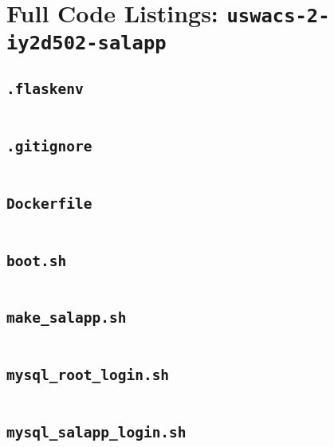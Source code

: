 \section{Full Code Listings: \texttt{uswacs-2-iy2d502-salapp}}
\subsection{\texttt{.flaskenv}}
\begin{codelisting}
\inputminted[breakanywhere]{text}{../uswacs-2-iy2d502-salapp/.flaskenv}\end{codelisting}
\subsection{\texttt{.gitignore}}
\begin{codelisting}
\inputminted[breakanywhere]{text}{../uswacs-2-iy2d502-salapp/.gitignore}\end{codelisting}
\subsection{\texttt{Dockerfile}}
\begin{codelisting}
\inputminted[breakanywhere]{text}{../uswacs-2-iy2d502-salapp/Dockerfile}\end{codelisting}
\subsection{\texttt{boot.sh}}
\begin{codelisting}
\inputminted[breakanywhere]{bash}{../uswacs-2-iy2d502-salapp/boot.sh}\end{codelisting}
\subsection{\texttt{make\_salapp.sh}}
\begin{codelisting}
\inputminted[breakanywhere]{bash}{../uswacs-2-iy2d502-salapp/make_salapp.sh}\end{codelisting}
\subsection{\texttt{mysql\_root\_login.sh}}
\begin{codelisting}
\inputminted[breakanywhere]{bash}{../uswacs-2-iy2d502-salapp/mysql_root_login.sh}\end{codelisting}
\subsection{\texttt{mysql\_salapp\_login.sh}}
\begin{codelisting}
\inputminted[breakanywhere]{bash}{../uswacs-2-iy2d502-salapp/mysql_salapp_login.sh}\end{codelisting}
